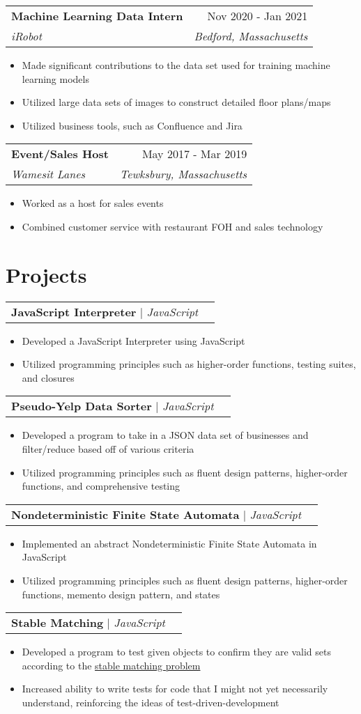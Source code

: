 \documentclass[letterpaper,11pt]{article}
\makeatletter
\newcommand{\resumeItem}[1]{
  \item\small{
    {#1 \vspace{-2pt}}
  }
}
\newcommand{\resumeSubheading}[4]{
  \vspace{-2pt}\item
    \begin{tabular*}{0.97\textwidth}[t]{l@{\extracolsep{\fill}}r}
      \textbf{#1} & #2 \\
      \textit{\small#3} & \textit{\small #4} \\
    \end{tabular*}\vspace{-7pt}
}
\newcommand{\resumeProjectHeading}[2]{
    \item
    \begin{tabular*}{0.97\textwidth}{l@{\extracolsep{\fill}}r}
      \small#1 & #2 \\
    \end{tabular*}\vspace{-7pt}
}
\newcommand{\resumeSubHeadingListEnd}{\end{itemize}}
\newcommand{\resumeItemListStart}{\begin{itemize}}
\newcommand{\resumeItemListEnd}{\end{itemize}\vspace{-5pt}}
\makeatother
\begin{document}
    \resumeSubheading
      {Machine Learning Data Intern}{Nov 2020 - Jan 2021}
      {iRobot}{Bedford, Massachusetts}
      \resumeItemListStart
        \resumeItem{Made significant contributions to the data set used for training machine learning models}
        \resumeItem{Utilized large data sets of images to construct detailed floor plans/maps}
        \resumeItem{Utilized business tools, such as Confluence and Jira}
    \resumeItemListEnd
    \resumeSubheading{Event/Sales Host}{May 2017 - Mar 2019}{Wamesit Lanes}{Tewksbury, Massachusetts}
        \resumeItemListStart
            \resumeItem{Worked as a host for sales events}
            \resumeItem{Combined customer service with restaurant FOH and sales technology}
  \resumeSubHeadingListEnd


\section{Projects}
      \resumeProjectHeading
          {\textbf{JavaScript Interpreter} $|$ \emph{JavaScript}}{}
          \resumeItemListStart
            \resumeItem{Developed a JavaScript Interpreter using JavaScript}
            \resumeItem{Utilized programming principles such as higher-order functions, testing suites, and closures}
          \resumeItemListEnd
      \resumeProjectHeading
          {\textbf{Pseudo-Yelp Data Sorter} $|$ \emph{JavaScript}}{}
          \resumeItemListStart
            \resumeItem{Developed a program to take in a JSON data set of businesses and filter/reduce based off of various criteria}
            \resumeItem{Utilized programming principles such as fluent design patterns, higher-order functions, and comprehensive testing}\\
          \resumeItemListEnd
     \resumeProjectHeading
          {\textbf{Nondeterministic Finite State Automata} $|$ \emph{JavaScript}}{}
          \resumeItemListStart
            \resumeItem{Implemented an abstract Nondeterministic Finite State Automata in JavaScript}
            \resumeItem{Utilized programming principles such as fluent design patterns, higher-order functions, memento design pattern, and states}\\
          \resumeItemListEnd
     \resumeProjectHeading
        {\textbf{Stable Matching} $|$ \emph{JavaScript}}{}
        \resumeItemListStart
            \resumeItem{Developed a program to test given objects to confirm they are valid sets according to the  \href{https://en.wikipedia.org/wiki/Stable_marriage_problem}{stable matching problem}}\\
            \resumeItem{Increased ability to write tests for code that I might not yet necessarily understand, reinforcing the ideas of test-driven-development}
          \resumeItemListEnd
\end{document}
